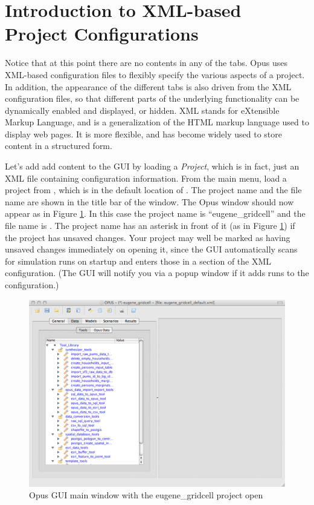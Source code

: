 \section{Introduction to XML-based Project Configurations}
\label{sec:intro-to-xml-based-project-configurations}

Notice that at this point there are no contents in any of the tabs.
Opus uses XML-based configuration files to flexibly specify the various
aspects of a project.  In addition, the appearance of the different tabs is
also driven from the XML configuration files, so that different parts of
the underlying functionality can be dynamically enabled and displayed, or
hidden.  XML stands for eXtensible Markup Language, and is a generalization
of the HTML markup language used to display web pages.  It is more
flexible, and has become widely used to store content in a structured form.

Let's add add content to the GUI by loading a \emph{Project}, which is in
fact, just an XML file containing configuration information.  From the main
menu, load a project from , which is in
the default location of .  The project name and
the file name are shown in the title bar of the window.  The Opus window
should now appear as in Figure \ref{fig:opus2}.  In this case the project
name is ``eugene\_gridcell'' and the file name is
.  The project name has an asterisk in
front of it (as in Figure \ref{fig:opus2}) if the project has unsaved
changes.  Your project may well be marked as having unsaved changes
immediately on opening it, since the GUI automatically scans for simulation
runs on startup and enters those in a section of the XML configuration.
(The GUI will notify you via a popup window if it adds runs to the
configuration.)

\begin{figure}[htp]
\begin{center}
\includegraphics[scale=0.52]{part-gui/images/opus-open-project.png}
\end{center}
\caption{Opus GUI main window with the eugene\_gridcell project open}
\label{fig:opus2}
\end{figure}

